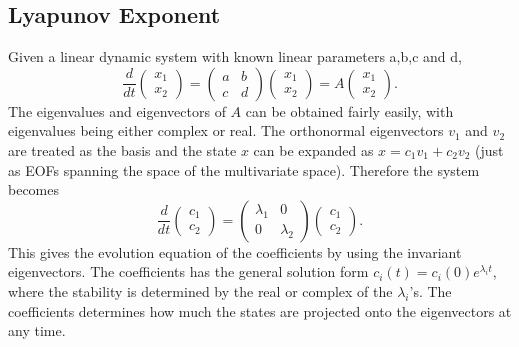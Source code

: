 \subsection{Lyapunov Exponent} 
    Given a linear dynamic system with known linear parameters a,b,c and d, 
    \begin{equation} 
        \frac{d}{dt} 
        \begin{pmatrix} x_1 \\ x_2 \end{pmatrix} = 
        \begin{pmatrix} a & b \\ c & d \end{pmatrix} 
        \begin{pmatrix} x_1 \\ x_2 \end{pmatrix} = A 
        \begin{pmatrix} x_1 \\ x_2 \end{pmatrix}.  
    \end{equation} 
    The eigenvalues and eigenvectors of $A$ can be obtained fairly easily, with eigenvalues being either complex or real.  
    The orthonormal eigenvectors $v_1$ and $v_2$ are treated as the basis and the state $x$ 
    can be expanded as $x = c_1v_1 + c_2v_2$ (just as EOFs spanning the space of the multivariate space).  
    Therefore the system becomes 
    \begin{equation} 
        \frac{d}{dt} \begin{pmatrix} c_1 \\ c_2 \end{pmatrix} = \begin{pmatrix} \lambda_1 & 0 \\ 0 & \lambda_2 \end{pmatrix} \begin{pmatrix} c_1 \\ c_2 \end{pmatrix}. 
    \end{equation} 
    This gives the evolution equation of the coefficients by using the invariant eigenvectors.  
    The coefficients has the general solution form $c_i(t) = c_i(0)e^{\lambda_i t}$, where the stability is determined by the real or complex of the $\lambda_i$'s.  
    The coefficients determines how much the states are projected onto the eigenvectors at any time.


